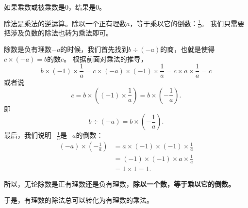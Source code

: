\documentclass[12pt,UTF8,fontset=none]{ctexbook}
\begin{document}
如果乘数或被乘数是$0$，结果是$0$。

除法是乘法的逆运算。除以一个正有理数$a$，等于乘以它的倒数：$\frac{1}{a}$。
我们只需要把涉及负数的除法也转为乘法即可。

除数是负有理数$-a$的时候，我们首先找到$b \div (-a)$的商，也就是使得$c \times (-a) = b$的数$c$。
根据前面对乘法的推导，
$$ b \times (-1) \times \frac{1}{a} = c \times (-a) \times (-1) \times \frac{1}{a} = c \times a \times \frac{1}{a} = c$$
或者说
$$c = b\times \left((-1) \times \frac{1}{a}\right) = b\times \left(-\frac{1}{a}\right) .$$
即
$$b \div (-a) = b\times \left(-\frac{1}{a}\right). $$
最后，我们说明$-\frac{1}{a}$是$-a$的倒数：
\begin{align*}
    (-a) \times \left(-\frac{1}{a}\right) &= a \times (-1) \times (-1) \times \frac{1}{a} \\
    &= (-1)\times (-1) \times a \times \frac{1}{a} \\
    &= 1 \times 1 = 1.
\end{align*}

所以，无论除数是正有理数还是负有理数，\textbf{除以一个数，等于乘以它的倒数。}

\begin{center}
\end{center}

于是，有理数的除法总可以转化为有理数的乘法。
\end{document}
